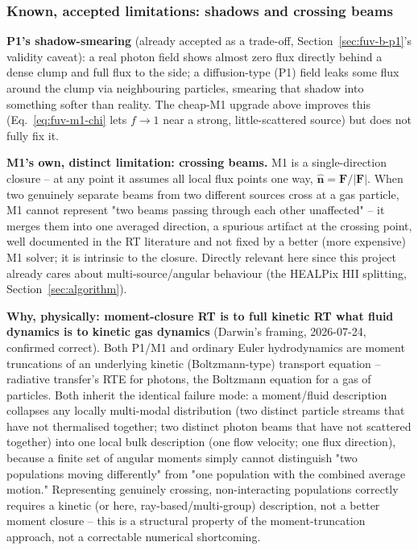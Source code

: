 \subsubsection{Known, accepted limitations: shadows and crossing beams}
\label{sec:fuv-b-limits}

\textbf{P1's shadow-smearing} (already accepted as a trade-off,
Section~\ref{sec:fuv-b-p1}'s validity caveat): a real photon field shows
almost zero flux directly behind a dense clump and full flux to the
side; a diffusion-type (P1) field leaks some flux around the clump via
neighbouring particles, smearing that shadow into something softer than
reality. The cheap-M1 upgrade above improves this (Eq.~\ref{eq:fuv-m1-chi}
lets $f\to1$ near a strong, little-scattered source) but does not fully
fix it.

\textbf{M1's own, distinct limitation: crossing beams.} M1 is a
single-direction closure -- at any point it assumes all local flux
points one way, $\hat{\mathbf n}=\mathbf F/|\mathbf F|$. When two
genuinely separate beams from two different sources cross at a gas
particle, M1 cannot represent "two beams passing through each other
unaffected" -- it merges them into one averaged direction, a
spurious artifact at the crossing point, well documented in the RT
literature and not fixed by a better (more expensive) M1 solver; it is
intrinsic to the closure. Directly relevant here since this project
already cares about multi-source/angular behaviour (the HEALPix HII
splitting, Section~\ref{sec:algorithm}).

\textbf{Why, physically: moment-closure RT is to full kinetic RT what
fluid dynamics is to kinetic gas dynamics} (Darwin's framing,
2026-07-24, confirmed correct). Both P1/M1 and ordinary Euler
hydrodynamics are moment truncations of an underlying kinetic
(Boltzmann-type) transport equation -- radiative transfer's RTE for
photons, the Boltzmann equation for a gas of particles. Both inherit
the identical failure mode: a moment/fluid description collapses any
locally multi-modal distribution (two distinct particle streams that
have not thermalised together; two distinct photon beams that have not
scattered together) into one local bulk description (one flow velocity;
one flux direction), because a finite set of angular moments simply
cannot distinguish "two populations moving differently" from "one
population with the combined average motion." Representing genuinely
crossing, non-interacting populations correctly requires a kinetic (or
here, ray-based/multi-group) description, not a better moment closure --
this is a structural property of the moment-truncation approach, not a
correctable numerical shortcoming.

